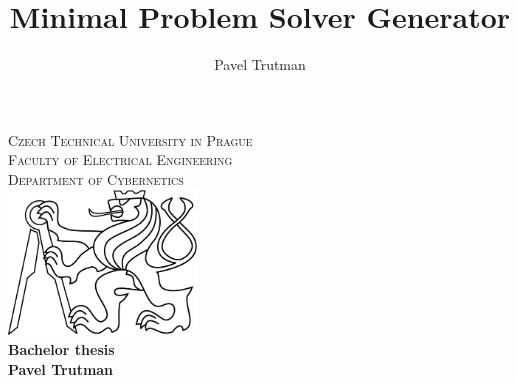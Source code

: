 \documentclass[oneside]{article}
\title{Minimal Problem Solver Generator}
\author{Pavel Trutman}
\begin{document}
\begin{titlepage}
\begin{center}

  \textsc{\LARGE Czech Technical University in Prague}\\[0.5cm]
  \textsc{\Large Faculty of Electrical Engineering}\\[0.5cm]
  \textsc{\Large Department of Cybernetics}\\[4cm]

  \includegraphics[width=5cm]{lev.png}\\[6cm]

  \textbf{\Huge Bachelor thesis}\\[2cm]
  \vfill
   \hfill {\textbf{\LARGE Pavel Trutman}}\hspace{1cm}

\end{center}
\end{titlepage}
\end{document}
